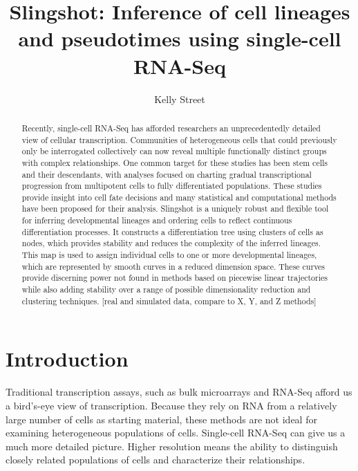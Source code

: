 \documentclass[11pt]{article}\usepackage[]{graphicx}\usepackage[]{color}
\title{Slingshot: Inference of cell lineages and pseudotimes using single-cell RNA-Seq}
\author{Kelly Street}
\date{}
\begin{document}
\maketitle

\begin{abstract}
  
Recently, single-cell RNA-Seq has afforded researchers an unprecedentedly detailed view of cellular transcription. Communities of heterogeneous cells that could previously only be interrogated collectively can now reveal multiple functionally distinct groups with complex relationships. One common target for these studies has been stem cells and their descendants, with analyses focused on charting gradual transcriptional progression from multipotent cells to fully differentiated populations. These studies provide insight into cell fate decisions and many statistical and computational methods have been proposed for their analysis. Slingshot is a uniquely robust and flexible tool for inferring developmental lineages and ordering cells to reflect continuous differentiation processes. It constructs a differentiation tree using clusters of cells as nodes, which provides stability and reduces the complexity of the inferred lineages. This map is used to assign individual cells to one or more developmental lineages, which are represented by smooth curves in a reduced dimension space. These curves provide discerning power not found in methods based on piecewise linear trajectories while also adding stability over a range of possible dimensionality reduction and clustering techniques. [real and simulated data, compare to X, Y, and Z methods]

\end{abstract}

\section{Introduction}

Traditional transcription assays, such as bulk microarrays and RNA-Seq afford us a bird's-eye view of transcription. Because they rely on RNA from a relatively large number of cells as starting material, these methods are not ideal for examining heterogeneous populations of cells. Single-cell RNA-Seq can give us a much more detailed picture. Higher resolution means the ability to distinguish closely related populations of cells and characterize their relationships.
\end{document}
